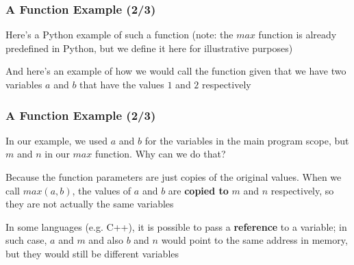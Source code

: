 \documentclass{beamer}
\begin{document}
\begin{frame}
\frametitle{A Function Example (2/3)}
    Here's a Python example of such a function (note: the $max$ function is already predefined in Python, but we define it here for illustrative purposes)
    
    \vspace{0.5cm}

    And here's an example of how we would call the function given that we have two variables $a$ and $b$ that have the values $1$ and $2$ respectively
    
\end{frame}

\begin{frame}
\frametitle{A Function Example (2/3)}
    In our example, we used $a$ and $b$ for the variables in the main program scope, but $m$ and $n$ in our $max$ function. Why can we do that?
    \newline

    Because the function parameters are just copies of the original values. When we call $max(a,b)$, the values of $a$ and $b$ are \textbf{copied to} $m$ and $n$ respectively, so they are not actually the same variables
    \newline

    In some languages (e.g. C++), it is possible to pass a \textbf{reference} to a variable; in such case, $a$ and $m$ and also $b$ and $n$ would point to the same address in memory, but they would still be different variables
\end{frame}
\end{document}
